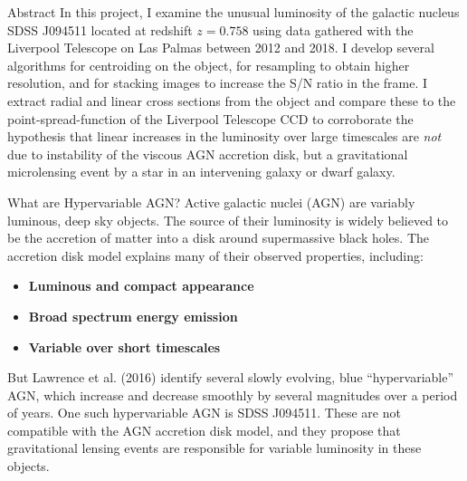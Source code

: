 \documentclass[final]{beamer}
\newlength{\colwidth}
\begin{document}
\begin{frame}[t]
\begin{columns}[t]
\begin{column}{\colwidth}
\begin{alertblock}{\LARGE Abstract}
In this project, I examine the unusual luminosity of the galactic nucleus
SDSS J094511 located at redshift $z=0.758$ using data gathered with the
Liverpool Telescope on Las Palmas between 2012 and 2018. I develop several
algorithms for centroiding on the object, for resampling to obtain higher
resolution, and for stacking images to increase the S/N ratio in the frame.
I extract radial and linear cross sections from the object and compare these
to the point-spread-function of the Liverpool Telescope CCD to corroborate
the hypothesis that linear increases in the luminosity over large timescales
are \textit{not} due to instability of the viscous AGN accretion disk, but a
gravitational microlensing event by a star in an intervening galaxy or dwarf
galaxy.
\end{alertblock}

\begin{block}{\LARGE What are Hypervariable AGN?}
\Large Active galactic nuclei (AGN) are variably luminous, deep sky objects. The source of their luminosity is widely believed to be the accretion of matter into a disk around supermassive black holes.\cite{lawrence_2018} The accretion disk model explains many of their observed properties, including:

\begin{center}
\begin{itemize}
    \centering
    \item \textbf{Luminous and compact appearance}
    \item \textbf{Broad spectrum energy emission}
    \item \textbf{Variable over short timescales}
\end{itemize}
\end{center}

But Lawrence et al. (2016) identify several slowly evolving, blue ``hypervariable'' AGN, which increase and decrease smoothly by several magnitudes over a period of years. One such hypervariable AGN is SDSS J094511. These are not compatible with the AGN accretion disk model, and they propose that gravitational lensing events are responsible for variable luminosity in these objects.\cite{lawrence_2016}
\end{block}


\end{column}
\end{columns}
\end{frame}
\end{document}
